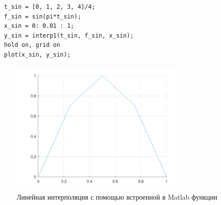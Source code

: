\begin{lstlisting}
  t_sin = [0, 1, 2, 3, 4]/4;
  f_sin = sin(pi*t_sin);
  x_sin = 0: 0.01 : 1;
  y_sin = interp1(t_sin, f_sin, x_sin);
  hold on, grid on
  plot(x_sin, y_sin);
\end{lstlisting}
\begin{figure}[h]
  \caption{Линейная интерполяция с помощью встроенной в Matlab функции}
  \label{fig:plot_add}
  \centering
  \includegraphics[width=0.8\textwidth]{images/additional.png}
\end{figure}
